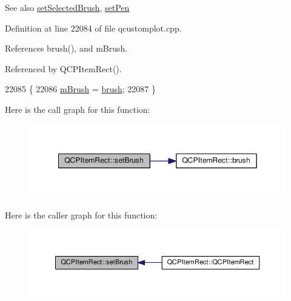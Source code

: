 \begin{DoxySeeAlso}{See also}
\hyperlink{class_q_c_p_item_rect_abd1792859844118dedee86223cede7af}{set\+Selected\+Brush}, \hyperlink{class_q_c_p_item_rect_a483c0da5a17e1646cd17ddea2c124e7d}{set\+Pen} 
\end{DoxySeeAlso}


Definition at line 22084 of file qcustomplot.\+cpp.



References brush(), and m\+Brush.



Referenced by Q\+C\+P\+Item\+Rect().


\begin{DoxyCode}
22085 \{
22086   \hyperlink{class_q_c_p_item_rect_a2d7f207fada27588b3a52b19234d3c2e}{mBrush} = \hyperlink{class_q_c_p_item_rect_a03d2d26ffcac78b25b8e90915f9c4abe}{brush};
22087 \}
\end{DoxyCode}


Here is the call graph for this function\+:\nopagebreak
\begin{figure}[H]
\begin{center}
\leavevmode
\includegraphics[width=349pt]{class_q_c_p_item_rect_abbd4e346a03513ee466afc25d9c75446_cgraph}
\end{center}
\end{figure}




Here is the caller graph for this function\+:\nopagebreak
\begin{figure}[H]
\begin{center}
\leavevmode
\includegraphics[width=350pt]{class_q_c_p_item_rect_abbd4e346a03513ee466afc25d9c75446_icgraph}
\end{center}
\end{figure}


